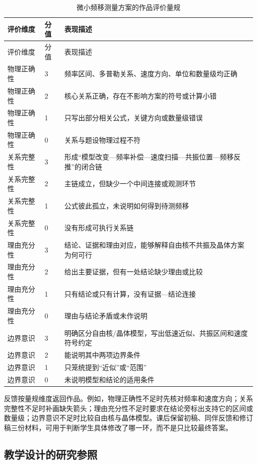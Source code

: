 \documentclass[
  12pt,
  a4paper,twoside,openany]{ctexbook}
\begin{document}
\begingroup
\small
\setlength{\tabcolsep}{4pt}
\begin{longtable}{p{2.15cm}p{0.9cm}p{9.85cm}}
\caption{微小频移测量方案的作品评价量规}\label{tab:mossbauer-rubric}\\
\toprule
评价维度 & 分值 & 表现描述 \\
\midrule
\endfirsthead
\toprule
评价维度 & 分值 & 表现描述 \\
\midrule
\endhead
物理正确性 & 3 & 频率区间、多普勒关系、速度方向、单位和数量级均正确 \\
物理正确性 & 2 & 核心关系正确，存在不影响方案的符号或计算小错 \\
物理正确性 & 1 & 只写出部分相关公式，关键方向或数量级错误 \\
物理正确性 & 0 & 关系与题设物理过程不符 \\
\midrule
关系完整性 & 3 & 形成“模型改变—频率补偿—速度扫描—共振位置—频移反推”的闭合链 \\
关系完整性 & 2 & 主链成立，但缺少一个中间连接或观测环节 \\
关系完整性 & 1 & 公式彼此孤立，未说明如何得到待测频移 \\
关系完整性 & 0 & 没有形成可执行关系链 \\
\midrule
理由充分性 & 3 & 结论、证据和理由对应，能够解释自由核不共振及晶体方案为何可行 \\
理由充分性 & 2 & 给出主要证据，但有一处结论缺少理由或比较 \\
理由充分性 & 1 & 只有结论或只有计算，没有证据—结论连接 \\
理由充分性 & 0 & 理由与结论矛盾或未作说明 \\
\midrule
边界意识 & 3 & 明确区分自由核/晶体模型，写出低速近似、共振区间和速度符号约定 \\
边界意识 & 2 & 能说明其中两项边界条件 \\
边界意识 & 1 & 只笼统提到“近似”或“范围” \\
边界意识 & 0 & 未说明模型和结论的适用条件 \\
\bottomrule
\end{longtable}
\endgroup

反馈按量规维度返回作品。例如，物理正确性不足时先核对频率和速度方向；关系完整性不足时补画缺失箭头；理由充分性不足时要求在结论旁标出支持它的区间或数量级；边界意识不足时比较自由核与晶体模型。课后保留初稿、同伴反馈和修订稿三份材料，可用于判断学生具体修改了哪一环，而不是只比较最终答案。

\subsection{教学设计的研究参照}\label{ux6559ux5b66ux8bbeux8ba1ux7684ux7814ux7a76ux53c2ux7167}
\end{document}

